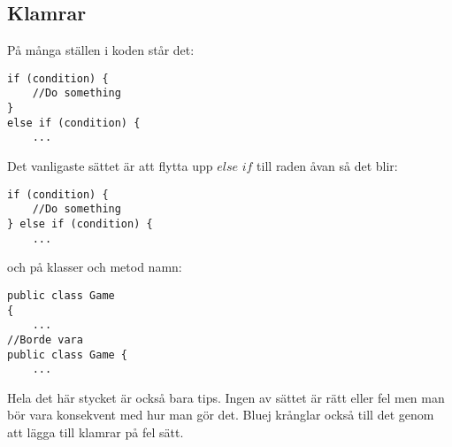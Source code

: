 \documentclass[a4paper,11pt]{article}
\begin{document}
\subsection{Klamrar}
På många ställen i koden står det:
\begin{lstlisting}
if (condition) {
    //Do something
}
else if (condition) {
    ...
\end{lstlisting}
Det vanligaste sättet är att flytta upp $else$ $if$ till raden åvan så det blir:
\begin{lstlisting}
if (condition) {
    //Do something
} else if (condition) {
    ...
\end{lstlisting}
och på klasser och metod namn:
\begin{lstlisting}
public class Game 
{
    ...
//Borde vara
public class Game {
    ...
\end{lstlisting}
Hela det här stycket är också bara tips. Ingen av sättet är rätt eller fel men man bör vara konsekvent med hur man gör det. Bluej krånglar också till det genom att lägga till klamrar på fel sätt.
\end{document}
